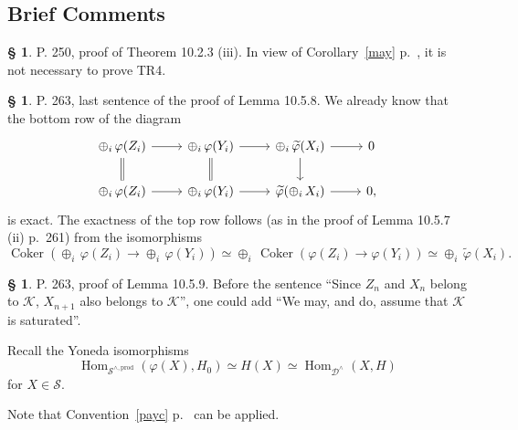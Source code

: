 \documentclass[12pt]{article}
\theoremstyle{remark}
\theoremstyle{definition}
\newtheorem{s}[thm]{\S}
\newcommand{\cc}{\mathcal}
\DeclareMathOperator{\Coker}{Coker}
\DeclareMathOperator{\Hom}{Hom}%
\begin{document}
\subsection{Brief Comments}
%
\begin{s} 
P. 250, proof of Theorem 10.2.3 (iii). In view of Corollary~\ref{may} p.~\pageref{may}, it is not necessary to prove TR4.
\end{s}
%
%
\begin{s} P. 263, last sentence of the proof of Lemma 10.5.8. We already know that the bottom row of the diagram 
$$
\begin{tikzcd}
\oplus_i\,\varphi(Z_i)\ar[equal]{d}\ar{r}&\oplus_i\,\varphi(Y_i)\ar[equal]{d}\ar{r}&\oplus_i\,\widetilde\varphi(X_i)\ar{d}\ar{r}&0\\ 
\oplus_i\,\varphi(Z_i)\ar{r}&\oplus_i\,\varphi(Y_i)\ar{r}&\widetilde\varphi(\oplus_i\,X_i)\ar{r}&0,
\end{tikzcd}
$$ 
is exact. The exactness of the top row follows (as in the proof of Lemma 10.5.7 (ii) p.~261) from the isomorphisms 
$$
\Coker(\oplus_i\,\varphi(Z_i)\to\oplus_i\,\varphi(Y_i))\simeq\oplus_i\,\Coker(\varphi(Z_i)\to\varphi(Y_i))\simeq\oplus_i\,\widetilde\varphi(X_i).
$$
\end{s}
%
%
\begin{s} P. 263, proof of Lemma 10.5.9. Before the sentence ``Since $Z_n$ and $X_n$ belong to $\cc K$, $X_{n+1}$ also belongs to $\cc K$'', one could add ``We may, and do, assume that $\cc K$ is saturated''.

Recall the Yoneda isomorphisms 
$$
\Hom_{\cc S^{\wedge,\text{prod}}}(\varphi(X),H_0)\simeq H(X)\simeq\Hom_{\cc D^\wedge}(X,H)
$$ 
for $X\in\cc S$.

Note that Convention~\ref{payc} p.~\pageref{payc} can be applied.
\end{s}
%
%
\end{document}
